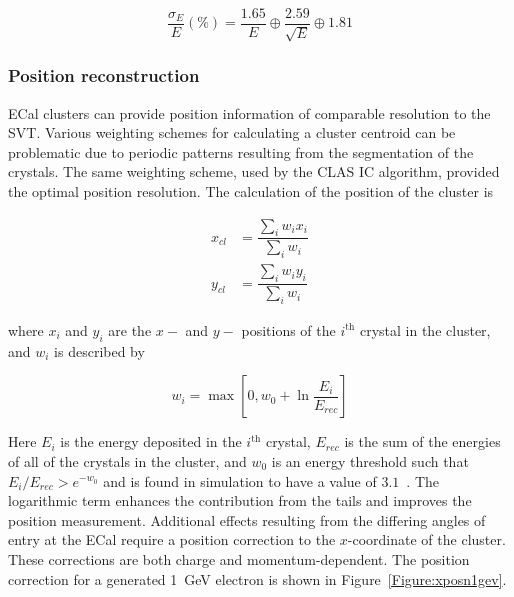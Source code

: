 \begin{equation}
\label{eq:eResUpdated}
\dfrac{\sigma_E}{E} (\%) = \dfrac{1.65}{E} \oplus \dfrac{2.59}{\sqrt{E}} \oplus 1.81 
\end{equation}

\subsubsection{Position reconstruction}
\indent ECal clusters can provide position information of comparable resolution to the SVT. Various weighting schemes for calculating a cluster centroid can be problematic due to periodic patterns resulting from the segmentation of the crystals. The same weighting scheme, used by the CLAS IC algorithm, provided the optimal position resolution. The calculation of the position of the cluster is~\cite{szumila-vance_hps_ecal_2014}

\begin{equation}
\begin{split}
\label{eq:posncalc}
x_{cl} & =  \dfrac{\sum_i w_i x_i}{\sum_i w_i}\\
y_{cl} & =  \dfrac{\sum_i w_i y_i}{\sum_i w_i}
\end{split}
\end{equation}

where $x_i$ and $y_i$ are the $x-$ and $y-$ positions of the $i^{\textrm{th}}$ crystal in the cluster, and $w_i$ is described by 

\begin{equation}
\label{eq:posnwt}
w_i  =  \max[0, w_0+\ln\dfrac{E_i}{E_{rec}}]
\end{equation}

Here $E_i$ is the energy deposited in the $i^{\textrm{th}}$ crystal, $E_{rec}$ is the sum of the energies of all of the crystals in the cluster, and $w_0$ is an energy threshold such that $E_i/E_{rec} > e^{-w_0}$ and is found in simulation to have a value of $3.1$~\cite{szumila-vance_hps_ecal_2014}. The logarithmic term enhances the contribution from the tails and improves the position measurement. Additional effects resulting from the differing angles of entry at the ECal require a position correction to the $x$-coordinate of the cluster. These corrections are both charge and momentum-dependent. The position correction for a generated 1~GeV electron is shown in Figure~\ref{Figure:xposn1gev}.

